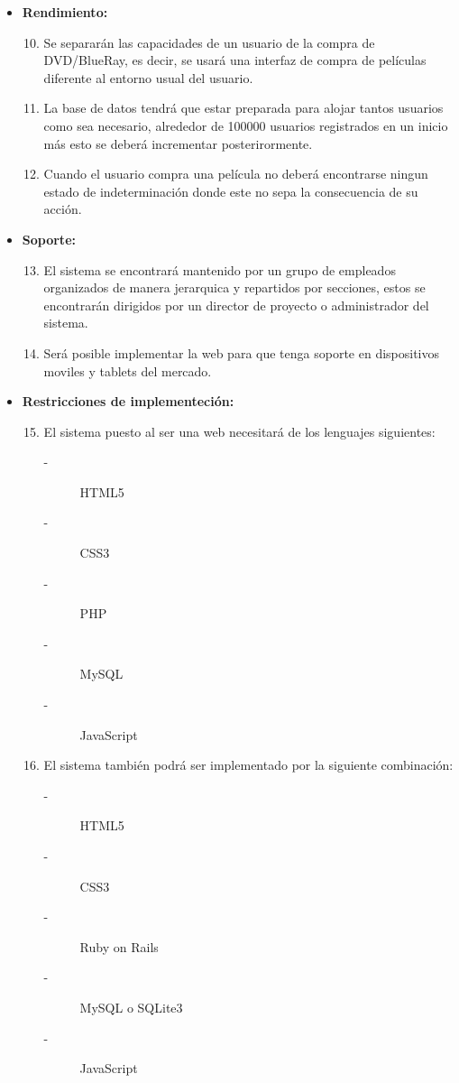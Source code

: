 \documentclass{article}
\begin{document}
\begin{itemize}
    \item \textbf{Rendimiento:}
        \begin{enumerate}[label=\bfseries RNF- \arabic*:]
        \setcounter{enumi}{9}
        \item Se separarán las capacidades de un usuario de la compra de DVD/BlueRay, es decir, se usará una interfaz de compra de películas diferente al entorno usual del usuario.
        \item La base de datos tendrá que estar preparada para alojar tantos usuarios como sea necesario, alrededor de 100000 usuarios registrados en un inicio más esto se deberá incrementar posterirormente.
        \item Cuando el usuario compra una película no deberá encontrarse ningun estado de indeterminación donde este no sepa la consecuencia de su acción.
        \end{enumerate}
        
    \item \textbf{Soporte:}
        \begin{enumerate}[label=\bfseries RNF- \arabic*:]
        \setcounter{enumi}{12}
        \item El sistema se encontrará mantenido por un grupo de empleados organizados de manera jerarquica y repartidos por secciones, estos se encontrarán dirigidos por un director de proyecto o administrador del sistema.
        \item Será posible implementar la web para que tenga soporte en dispositivos moviles y tablets del mercado.
        \end{enumerate}
        
    \item \textbf{Restricciones de implementeción:}
        \begin{enumerate}[label=\bfseries RNF- \arabic*:]
        \setcounter{enumi}{14}
        \item El sistema puesto al ser una web necesitará de los lenguajes siguientes:
            \begin{description}
            \item[-] HTML5
            \item[-] CSS3
            \item[-] PHP
            \item[-] MySQL
            \item[-] JavaScript
            \end{description}
        \item El sistema también podrá ser implementado por la siguiente combinación:
            \begin{description}
            \item[-] HTML5
            \item[-] CSS3
            \item[-] Ruby on Rails
            \item[-] MySQL o SQLite3
            \item[-] JavaScript
            \end{description}
        \end{enumerate}
        

\end{itemize}
\end{document}

